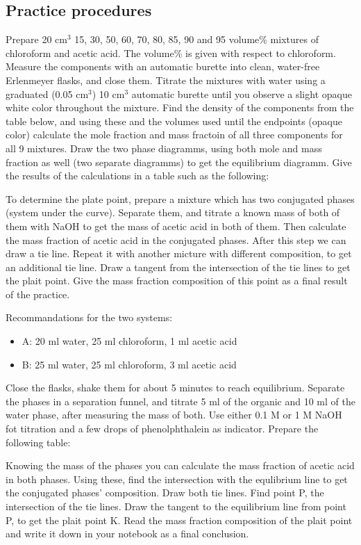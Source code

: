 \subsection{Practice procedures}

Prepare 20 cm$^3$ 15, 30, 50, 60, 70, 80, 85, 90 and 95 volume\% mixtures of chloroform and acetic acid. The volume\% is given with respect to chloroform. Measure the components with an automatic burette into clean, water-free Erlenmeyer flasks, and close them. Titrate the mixtures with water using a graduated (0.05 cm$^3$) 10 cm$^3$ automatic burette until you observe a slight opaque white color throughout the mixture. Find the density of the components from the table below, and using these and the volumes used until the endpoints (opaque color) calculate the mole fraction and mass fractoin of all three components for all 9 mixtures. Draw the two phase diagramms, using both mole and mass fraction as well (two separate diagramms) to get the equilibrium diagramm. Give the results of the calculations in a table such as the following:


To determine the plate point, prepare a mixture which has two conjugated phases (system under the curve). Separate them, and titrate a known mass of both of them with NaOH to get the mass of acetic acid in both of them. Then calculate the mass fraction of acetic acid in the conjugated phases. After this step we can draw a tie line. Repeat it with another micture with different composition, to get an additional tie line. Draw a tangent from the intersection of the tie lines to get the plait point. Give the mass fraction composition of this point as a final result of the practice.

Recommandations for the two systems:

\begin{itemize}
\item A: 20 ml water, 25 ml chloroform, 1 ml acetic acid
\item B: 25 ml water, 25 ml chloroform, 3 ml acetic acid
\end{itemize}

Close the flasks, shake them for about 5 minutes to reach equilibrium. Separate the phases in a separation funnel, and titrate 5 ml of the organic and 10 ml of the water phase, after measuring the mass of both. Use either 0.1 M or 1 M NaOH fot titration and a few drops of phenolphthalein as indicator. Prepare the following table:


Knowing the mass of the phases you can calculate the mass fraction of acetic acid in both phases. Using these, find the intersection with the equlibrium line to get the conjugated phases' composition. Draw both tie lines. Find point P, the intersection of the tie lines. Draw the tangent to the equilibrium line from point P, to get the plait point K. Read the mass fraction composition of the plait point and write it down in your notebook as a final conclusion.  


